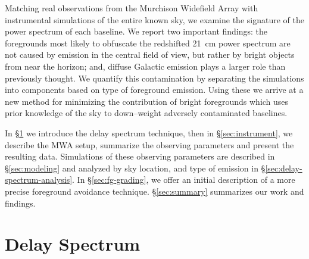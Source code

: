 \documentclass[preprint2,iop,numberedappendix]{emulateapj}
\begin{document}
Matching real observations from the Murchison Widefield Array with instrumental simulations of the entire known sky, we examine the signature of the power spectrum of each baseline. We report two important findings: the foregrounds most likely to obfuscate the redshifted 21~cm power spectrum are not caused by emission in the central field of view, but rather by bright objects from near the horizon; and, diffuse Galactic emission plays a larger role than previously thought. %
We quantify this contamination by separating the simulations into components based on type of foreground emission. Using these we arrive at a new method for minimizing the contribution of bright foregrounds which uses prior knowledge of the sky to down--weight adversely contaminated baselines.

In \S\ref{sec:delay-spectrum} we introduce the delay spectrum technique, then in  \S\ref{sec:instrument}, we describe the MWA setup, summarize the observing parameters and present the resulting data. Simulations of these observing parameters are described in \S\ref{sec:modeling} and analyzed by sky location, and type of emission in \S\ref{sec:delay-spectrum-analysis}. In \S\ref{sec:fg-grading}, we offer an initial description of a more precise foreground avoidance technique. \S\ref{sec:summary} summarizes our work and findings.

\section{Delay Spectrum}\label{sec:delay-spectrum}
\end{document}

